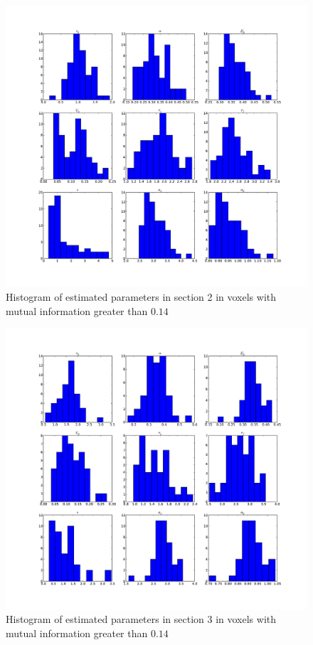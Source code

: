 \begin{figure} %
\centering
\includegraphics[clip=true,trim=2.5cm 2cm 2cm 1cm,width=15cm]{images/slicesim_hist2}
\caption{Histogram of estimated parameters in section 2 in voxels with mutual information greater
than $0.14$}
\label{fig:slicesim_hist2}
\end{figure}

\begin{figure} %
\centering
\includegraphics[clip=true,trim=2.5cm 2cm 2cm 1cm,width=15cm]{images/slicesim_hist3}
\caption{Histogram of estimated parameters in section 3 in voxels with mutual information greater
than $0.14$}
\label{fig:slicesim_hist3}
\end{figure}

